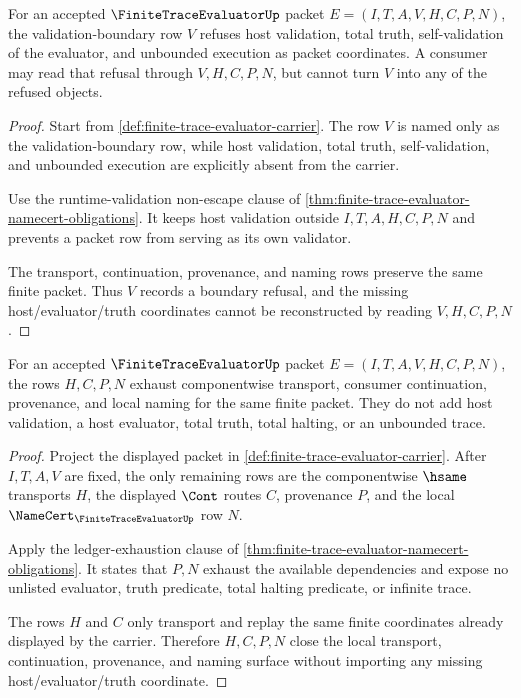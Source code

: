 \begin{theorem}
\label{thm:finite-trace-evaluator-validation-row-nonescape}
For an accepted $\FiniteTraceEvaluatorUp$ packet
$E=(I,T,A,V,H,C,P,N)$, the validation-boundary row $V$ refuses host validation,
total truth, self-validation of the evaluator, and unbounded execution as packet
coordinates. A consumer may read that refusal through $V,H,C,P,N$, but cannot
turn $V$ into any of the refused objects.
\end{theorem}
\begin{proof}
Start from \autoref{def:finite-trace-evaluator-carrier}. The row $V$ is named
only as the validation-boundary row, while host validation, total truth,
self-validation, and unbounded execution are explicitly absent from the carrier.

Use the runtime-validation non-escape clause of
\autoref{thm:finite-trace-evaluator-namecert-obligations}. It keeps host
validation outside $I,T,A,H,C,P,N$ and prevents a packet row from serving as its
own validator.

The transport, continuation, provenance, and naming rows preserve the same
finite packet. Thus $V$ records a boundary refusal, and the missing
host/evaluator/truth coordinates cannot be reconstructed by reading
$V,H,C,P,N$.
\end{proof}

\begin{theorem}
\label{thm:finite-trace-evaluator-provenance-exhaustion}
For an accepted $\FiniteTraceEvaluatorUp$ packet
$E=(I,T,A,V,H,C,P,N)$, the rows $H,C,P,N$ exhaust componentwise transport,
consumer continuation, provenance, and local naming for the same finite packet.
They do not add host validation, a host evaluator, total truth, total halting,
or an unbounded trace.
\end{theorem}
\begin{proof}
Project the displayed packet in \autoref{def:finite-trace-evaluator-carrier}.
After $I,T,A,V$ are fixed, the only remaining rows are the componentwise
$\hsame$ transports $H$, the displayed $\Cont$ routes $C$, provenance $P$, and
the local $\NameCert_{\FiniteTraceEvaluatorUp}$ row $N$.

Apply the ledger-exhaustion clause of
\autoref{thm:finite-trace-evaluator-namecert-obligations}. It states that
$P,N$ exhaust the available dependencies and expose no unlisted evaluator,
truth predicate, total halting predicate, or infinite trace.

The rows $H$ and $C$ only transport and replay the same finite coordinates
already displayed by the carrier. Therefore $H,C,P,N$ close the local transport,
continuation, provenance, and naming surface without importing any missing
host/evaluator/truth coordinate.
\end{proof}

